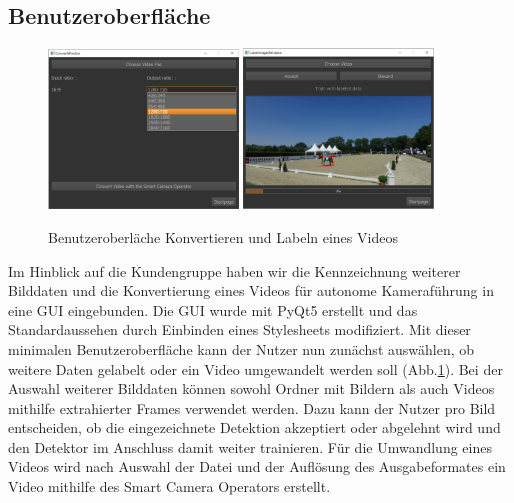 \subsection*{Benutzeroberfläche}

\begin{figure}[b]
\centering
\includegraphics[width=0.45\textwidth]{./img/GuiConvert2.png}
\includegraphics[width=0.45\textwidth]{./img/GuiLabel.png}
\caption{Benutzeroberläche Konvertieren und Labeln eines Videos}
\label{fig:gui}
\end{figure}

Im Hinblick auf die Kundengruppe haben wir die Kennzeichnung weiterer Bilddaten und die Konvertierung eines Videos für autonome Kameraführung in eine GUI eingebunden. Die GUI wurde mit PyQt5 erstellt und das Standardaussehen durch Einbinden eines Stylesheets modifiziert. Mit dieser minimalen Benutzeroberfläche kann der Nutzer nun zunächst auswählen, ob weitere Daten gelabelt oder ein Video umgewandelt werden soll (Abb.\ref{fig:gui}). Bei der Auswahl weiterer Bilddaten können sowohl Ordner mit Bildern als auch Videos mithilfe extrahierter Frames verwendet werden. Dazu kann der Nutzer pro Bild entscheiden, ob die eingezeichnete Detektion akzeptiert oder abgelehnt wird und den Detektor im Anschluss damit weiter trainieren. Für die Umwandlung eines Videos wird nach Auswahl der Datei und der Auflösung des Ausgabeformates ein Video mithilfe des Smart Camera Operators erstellt.



